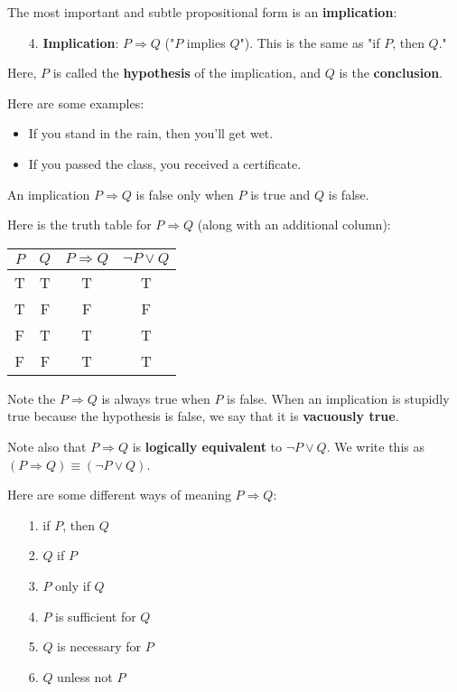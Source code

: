 \documentclass[12pt,a4paper]{article}
\begin{document}
\newpage

The most important and subtle propositional form is an \textbf{implication}:
\begin{itemize}
	\item[4.] \textbf{Implication}: $P\Rightarrow Q$ ("$P$ implies $Q$"). This is the same as "if $P$, then $Q$."
\end{itemize}

Here, $P$ is called the \textbf{hypothesis} of the implication, and $Q$ is the \textbf{conclusion}.

\bigbreak

Here are some examples:
\begin{itemize}
	\item If you stand in the rain, then you'll get wet.
	\item If you passed the class, you received a certificate.
\end{itemize}

An implication $P\Rightarrow Q$ is false only when $P$ is true and $Q$ is false.

\bigbreak

Here is the truth table for $P\Rightarrow Q$ (along with an additional column):
\begin{center}
	\begin{tabular}{ |c|c|c|c| }
		\hline
		$P$ & $Q$ & $P\Rightarrow Q$ & $\neg P \vee Q$ \\
		\hline
		T & T & T & T \\
		\hline
		T & F & F & F \\
		\hline
		F & T & T & T \\
		\hline
		F & F & T & T \\ 
		\hline
	\end{tabular}
\end{center}

Note the $P\Rightarrow Q$ is always true when $P$ is false. When an implication is stupidly true because the hypothesis is false, we say that it is \textbf{vacuously true}.

\bigbreak

Note also that $P\Rightarrow Q$ is \textbf{logically equivalent} to $\neg P \vee Q$. We write this as $(P\Rightarrow Q)\equiv(\neg P \vee Q)$.

\bigbreak

Here are some different ways of meaning $P\Rightarrow Q$:
\begin{itemize}
	\item[1.] if $P$, then $Q$
	\item[2.] $Q$ if $P$
	\item[3.] $P$ only if $Q$
	\item[4.] $P$ is sufficient for $Q$
	\item[5.] $Q$ is necessary for $P$
	\item[6.] $Q$ unless not $P$
\end{itemize}
\end{document}
